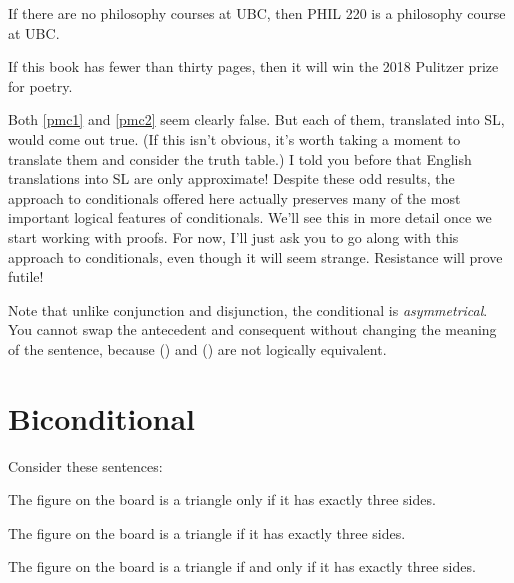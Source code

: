 \begin{earg}
\item[\ex{pmc1}] If there are no philosophy courses at UBC, then PHIL 220 is a philosophy course at UBC.
\item[\ex{pmc2}] If this book has fewer than thirty pages, then it will win the 2018 Pulitzer prize for poetry.
\end{earg}

Both \ref{pmc1} and \ref{pmc2} seem clearly false. But each of them, translated into SL, would come out true. (If this isn't obvious, it's worth taking a moment to translate them and consider the truth table.) I told you before that English translations into SL are only approximate! Despite these odd results, the approach to conditionals offered here actually preserves many of the most important logical features of conditionals. We'll see this in more detail once we start working with proofs. For now, I'll just ask you to go along with this approach to conditionals, even though it will seem strange. Resistance will prove futile! 

Note that unlike conjunction and disjunction, the conditional is \emph{asymmetrical}. You cannot swap the antecedent and consequent without changing the meaning of the sentence, because (\metaA{}\eif\metaB{}) and (\metaB{}\eif\metaA{}) are not logically equivalent.


%
%
%

\section{Biconditional}
Consider these sentences:
\begin{earg}
\item[\ex{iff1}] The figure on the board is a triangle only if it has exactly three sides.
\item[\ex{iff2}] The figure on the board is a triangle if it has exactly three sides.
\item[\ex{iff3}] The figure on the board is a triangle if and only if it has exactly three sides.
\end{earg}

